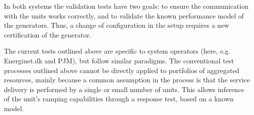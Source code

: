 In both systems the validation tests have two goals: to ensure the communication with the units works correctly, and to validate the known performance model of the generators. Thus, a change of configuration in the setup requires a new certification of the generator.

The current tests outlined above are specific to system operators (here, e.g. Energinet.dk and PJM), but follow similar paradigms. 
The conventional test processes outlined above cannot be directly applied to portfolios of aggregated resources, mainly because a common assumption in the process is that the service delivery is performed by a single or small number of units. This allows inference of the unit's ramping capabilities through a response test, based on a known model. 


